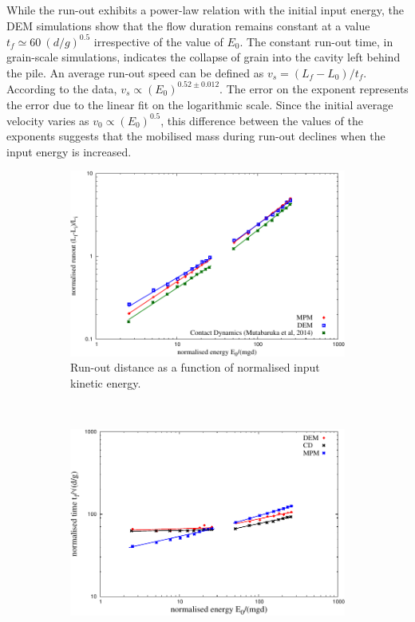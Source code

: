 While the run-out exhibits a power-law relation with the initial input energy, 
the DEM simulations show that the flow duration remains constant at a value  
$t_f \simeq 60 \  (d/g)^{0.5}$ irrespective of the value of $E_0$. The constant 
run-out time, in grain-scale simulations, indicates the collapse of grain into 
the cavity left behind the pile. An average run-out speed can be defined as 
$v_s = (L_f - L_0) / t_f$. According to the data, $v_s \propto 
(E_0)^{0.52\pm 0.012}$. The error on the exponent represents the 
error due to the linear fit on the logarithmic scale. Since the initial 
average velocity varies as $v_0 \propto (E_0)^{0.5}$, this difference between 
the values of the exponents suggests that the mobilised mass during run-out 
declines when the input energy is increased.


\begin{figure}[tbph]
\centering
\begin{subfigure}[b]{0.9\textwidth}
\centering
\includegraphics[width=\textwidth]{Runout_Eo_MPM_CD_DEM}
\caption{Run-out distance as a function of normalised input kinetic energy.}
\label{fig:Runout_Eo_MPM_CD_DEM}
\end{subfigure}
\\
\begin{subfigure}[b]{0.9\textwidth}
\centering
\includegraphics[width=\textwidth]{Tf_vs_Eo_Slope}

\end{subfigure}
\end{figure}
